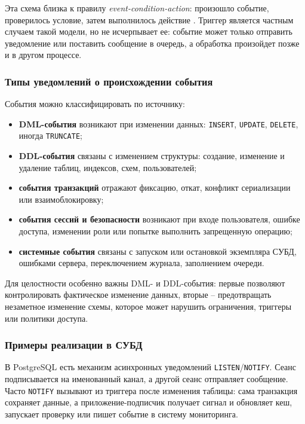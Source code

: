 Эта схема близка к правилу \textit{event-condition-action}: произошло событие, проверилось условие, затем выполнилось действие \autocite{ElmasriNavathe}. Триггер является частным случаем такой модели, но не исчерпывает ее: событие может только отправить уведомление или поставить сообщение в очередь, а обработка произойдет позже и в другом процессе.

\subsubsection{Типы уведомлений о происхождении события}

События можно классифицировать по источнику:
\begin{itemize}
    \item \textbf{DML-события} возникают при изменении данных: \texttt{INSERT}, \texttt{UPDATE}, \texttt{DELETE}, иногда \texttt{TRUNCATE};
    \item \textbf{DDL-события} связаны с изменением структуры: создание, изменение и удаление таблиц, индексов, схем, пользователей;
    \item \textbf{события транзакций} отражают фиксацию, откат, конфликт сериализации или взаимоблокировку;
    \item \textbf{события сессий и безопасности} возникают при входе пользователя, ошибке доступа, изменении роли или попытке выполнить запрещенную операцию;
    \item \textbf{системные события} связаны с запуском или остановкой экземпляра СУБД, ошибками сервера, переключением журнала, заполнением очереди.
\end{itemize}

Для целостности особенно важны DML- и DDL-события: первые позволяют контролировать фактическое изменение данных, вторые -- предотвращать незаметное изменение схемы, которое может нарушить ограничения, триггеры или политики доступа.

\subsubsection{Примеры реализации в СУБД}

В PostgreSQL есть механизм асинхронных уведомлений \texttt{LISTEN}/\texttt{NOTIFY}. Сеанс подписывается на именованный канал, а другой сеанс отправляет сообщение. Часто \texttt{NOTIFY} вызывают из триггера после изменения таблицы: сама транзакция сохраняет данные, а приложение-подписчик получает сигнал и обновляет кеш, запускает проверку или пишет событие в систему мониторинга.


